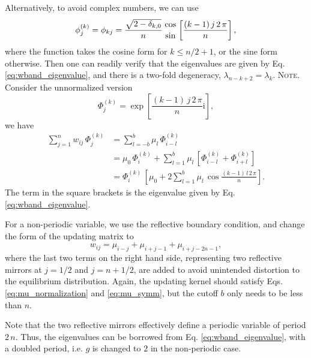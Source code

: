 \documentclass[reprint, superscriptaddress, floatfix]{revtex4-1}
\newcommand{\note}[1]{{\color{DarkGreen}\footnotesize \textsc{Note.} #1}}
\newcommand{\ii}{\mathrm{i}}
\begin{document}
%
Alternatively, to avoid complex numbers, we can use
%
\begin{equation}
  \phi^{(k)}_j
  =
  \phi_{kj}
  =
  \frac{ \sqrt{ 2 - \delta_{k,0} } } { n }
  \,
  {\cos \atop \sin}
  \left[
    \frac{ (k - 1) \, j \, 2 \, \pi }
         {            n             }
  \right]
  ,
  \notag
\end{equation}
%
where the function takes the cosine form for $k \le n/2 + 1$,
or the sine form otherwise.
%
Then one can readily verify that the eigenvalues are given by
  Eq. \eqref{eq:wband_eigenvalue},
  and there is a two-fold degeneracy,
  $\lambda_{n - k + 2} = \lambda_k$.
\note{Consider the unnormalized version
  $$
  \Phi^{(k)}_j =
  \exp\left[
    \frac{ ( k - 1 ) \, j \, 2 \, \pi }
         {              n             }
    \ii
  \right]
  ,
  $$
  we have
  $$
  \begin{aligned}
  \sum_{j = 1}^n
    w_{ij} \, \Phi^{(k)}_j
  &=
  \sum_{l = -b}^b
    \mu_l \, \Phi^{(k)}_{i - l}
  \\
  &=
  \mu_0 \, \Phi^{(k)}_i
  +
  \sum_{l = 1}^b
    \mu_l \,
    \left[ \Phi^{(k)}_{i - l} + \Phi^{(k)}_{i + l} \right]
  \\
  &=
  \Phi^{(k)}_i \,
  \left[
    \mu_0
    +
    2 \sum_{l = 1}^b
      \mu_l \, \cos
      \frac{ (k - 1) \, l \, 2 \, \pi }
           {            n             }
  \right]
  .
  \end{aligned}
  $$
  The term in the square brackets is the eigenvalue given by
  Eq. \eqref{eq:wband_eigenvalue}.
}
%


For a non-periodic variable,
we use the reflective boundary condition\cite{bussi2006},
and change the form of the updating matrix to
%
%
\begin{equation}
  w_{ij}
  =
  \mu_{ i - j }
  +
  \mu_{ i + j - 1 }
  +
  \mu_{ i + j - 2 n - 1 }
  ,
  \label{eq:w_band_refl}
\end{equation}
%
where the last two terms on the right hand side,
representing two reflective mirrors at
$j = 1/2$ and $j = n + 1/2$,
are added to avoid unintended distortion\cite{dickson2011, mcgovern2013}
to the equilibrium distribution\cite{bussi2006}.
%
Again, the updating kernel should satisfy
Eqs. \eqref{eq:mu_normalization}
and \eqref{eq:mu_symm},
but
the cutoff $b$ only needs to be less than $n$.

Note that the two reflective mirrors effectively
define a periodic variable of period $2 \, n$.
Thus, the eigenvalues can be borrowed from
Eq. \eqref{eq:wband_eigenvalue},
with a doubled period,
i.e. $g$ is changed to $2$ in the non-periodic case.
\end{document}
